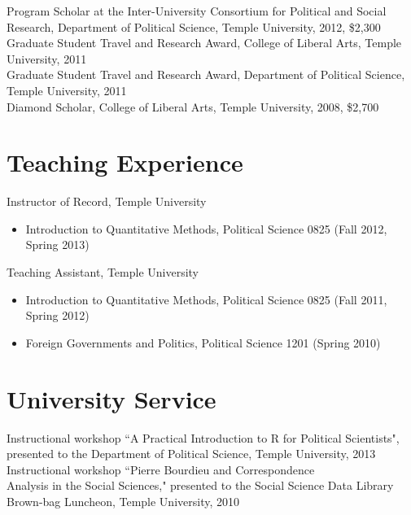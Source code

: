 \documentclass[margin, 12pt]{res} %
\begin{document}
\begin{resume}
Program Scholar at the Inter-University Consortium for Political and Social Research, Department of Political Science, Temple University, 2012, \$2,300 \vspace{3 mm} \\
Graduate Student Travel and Research Award, College of Liberal Arts, Temple University, 2011 \vspace{3 mm} \\ 
Graduate Student Travel and Research Award, Department of Political Science, Temple University, 2011 \vspace{3 mm} \\
Diamond Scholar, College of Liberal Arts, Temple University, 2008, \$2,700 \\


\section{Teaching Experience} 

Instructor of Record, Temple University\\
\begin{itemize}
\item Introduction to Quantitative Methods, Political Science 0825 (Fall 2012, Spring 2013)
\end{itemize}
Teaching Assistant, Temple University\\
\begin{itemize}
\item Introduction to Quantitative Methods, Political Science 0825 (Fall 2011, Spring 2012)
\item Foreign Governments and Politics, Political Science 1201 (Spring 2010)
\end{itemize}
 

\section{University Service}
Instructional workshop ``A Practical Introduction to R for Political Scientists",
presented to the Department of Political Science, Temple University, 2013 \vspace{3 mm}  \\
Instructional workshop ``Pierre Bourdieu and Correspondence \\ Analysis in the Social Sciences,"
presented to the Social Science Data Library Brown-bag Luncheon, Temple University, 2010


\end{resume}
\end{document}
